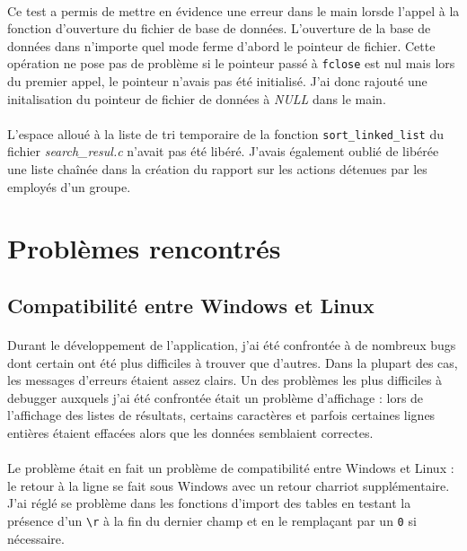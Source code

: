 \documentclass{article}
\begin{document}
    \paragraph{}
    Ce test a permis de mettre en évidence une erreur dans le main lorsde l'appel à la fonction d'ouverture du fichier de base de données. L'ouverture de la base de données dans n'importe quel mode ferme d'abord le pointeur de fichier. Cette opération ne pose pas de problème si le pointeur passé à \texttt{fclose} est nul mais lors du premier appel, le pointeur n'avais pas été initialisé. J'ai donc rajouté une initalisation du pointeur de fichier de données à \emph{NULL} dans le main.

    \paragraph{}
    L'espace alloué à la liste de tri temporaire de la fonction \texttt{sort\_linked\_list} du fichier \emph{search\_resul.c} n'avait pas été libéré. J'avais également oublié de libérée une liste chaînée dans la création du rapport sur les actions détenues par les employés d'un groupe.

    

    \newpage
    \section{Problèmes rencontrés}

    \subsection{Compatibilité entre Windows et Linux}
    \paragraph{}
    Durant le développement de l'application, j'ai été confrontée à de nombreux bugs dont certain ont été plus difficiles à trouver que d'autres. Dans la plupart des cas, les messages d'erreurs étaient assez clairs. Un des problèmes les plus difficiles à debugger auxquels j'ai été confrontée était un problème d'affichage : lors de l'affichage des listes de résultats, certains caractères et parfois certaines lignes entières étaient effacées alors que les données semblaient correctes.

    \paragraph{}
    Le problème était en fait un problème de compatibilité entre Windows et Linux : le retour à la ligne se fait sous Windows avec un retour charriot supplémentaire. J'ai réglé se problème dans les fonctions d'import des tables en testant la présence d'un \texttt{\textbackslash r} à la fin du dernier champ et en le remplaçant par un \texttt{0} si nécessaire.
\end{document}
